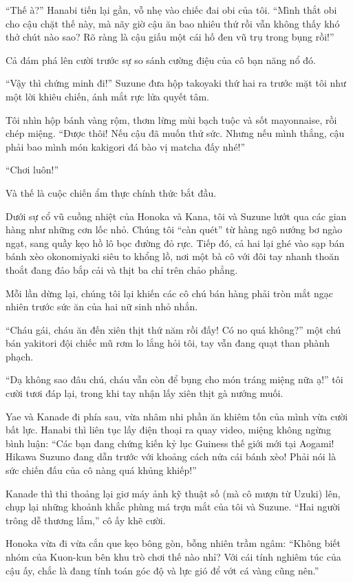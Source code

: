 \documentclass[../main.tex]{subfiles}
\begin{document}
``Thế à?'' Hanabi tiến lại gần, vỗ nhẹ vào chiếc đai obi của tôi. ``Mình thắt obi cho cậu chặt thế này, mà nãy giờ cậu ăn bao nhiêu thứ rồi vẫn không thấy khó thở chút nào sao? Rõ ràng là cậu giấu một cái hố đen vũ trụ trong bụng rồi!''

Cả đám phá lên cười trước sự so sánh cường điệu của cô bạn năng nổ đó.

``Vậy thì chứng minh đi!'' Suzune đưa hộp takoyaki thứ hai ra trước mặt tôi như một lời khiêu chiến, ánh mắt rực lửa quyết tâm.

Tôi nhìn hộp bánh vàng rộm, thơm lừng mùi bạch tuộc và sốt mayonnaise, rồi chép miệng. ``Được thôi! Nếu cậu đã muốn thử sức. Nhưng nếu mình thắng, cậu phải bao mình món kakigori đá bào vị matcha đấy nhé!''

``Chơi luôn!''

Và thế là cuộc chiến ẩm thực chính thức bắt đầu.

Dưới sự cổ vũ cuồng nhiệt của Honoka và Kana, tôi và Suzune lướt qua các gian hàng như những cơn lốc nhỏ. Chúng tôi ``càn quét'' từ hàng ngô nướng bơ ngào ngạt, sang quầy kẹo hồ lô bọc đường đỏ rực. Tiếp đó, cả hai lại ghé vào sạp bán bánh xèo okonomiyaki siêu to khổng lồ, nơi một bà cô với đôi tay nhanh thoăn thoắt đang đảo bắp cải và thịt ba chỉ trên chảo phẳng.

Mỗi lần dừng lại, chúng tôi lại khiến các cô chú bán hàng phải tròn mắt ngạc nhiên trước sức ăn của hai nữ sinh nhỏ nhắn.

``Cháu gái, cháu ăn đến xiên thịt thứ năm rồi đấy! Có no quá không?'' một chú bán yakitori đội chiếc mũ rơm lo lắng hỏi tôi, tay vẫn đang quạt than phành phạch.

``Dạ không sao đâu chú, cháu vẫn còn để bụng cho món tráng miệng nữa ạ!'' tôi cười tươi đáp lại, trong khi tay nhận lấy xiên thịt gà nướng muối.

Yae và Kanade đi phía sau, vừa nhâm nhi phần ăn khiêm tốn của mình vừa cười bất lực. Hanabi thì liên tục lấy điện thoại ra quay video, miệng không ngừng bình luận: ``Các bạn đang chứng kiến kỷ lục Guiness thế giới mới tại Aogami! Hikawa Suzuno đang dẫn trước với khoảng cách nửa cái bánh xèo! Phải nói là sức chiến đấu của cô nàng quá khủng khiếp!''

Kanade thì thi thoảng lại giơ máy ảnh kỹ thuật số (mà cô mượn từ Uzuki) lên, chụp lại những khoảnh khắc phùng má trợn mắt của tôi và Suzune. ``Hai người trông dễ thương lắm,'' cô ấy khẽ cười.

Honoka vừa đi vừa cắn que kẹo bông gòn, bỗng nhiên trầm ngâm: ``Không biết nhóm của Kuon-kun bên khu trò chơi thế nào nhỉ? Với cái tính nghiêm túc của cậu ấy, chắc là đang tính toán góc độ và lực gió để vớt cá vàng cũng nên.''
\end{document}

